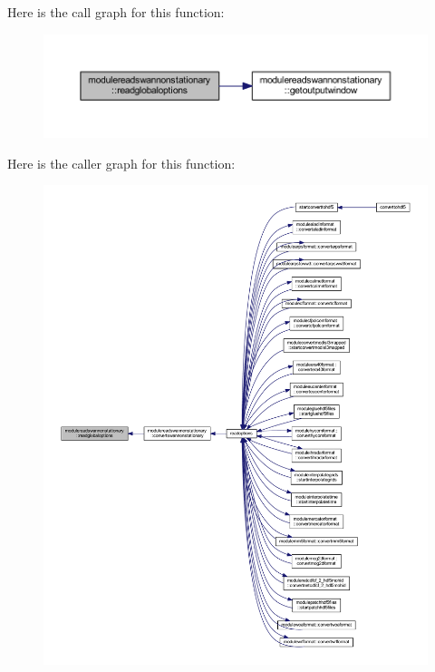 Here is the call graph for this function\+:\nopagebreak
\begin{figure}[H]
\begin{center}
\leavevmode
\includegraphics[width=350pt]{namespacemodulereadswannonstationary_a3ca3fa603083a13bf688eeba197ef307_cgraph}
\end{center}
\end{figure}
Here is the caller graph for this function\+:\nopagebreak
\begin{figure}[H]
\begin{center}
\leavevmode
\includegraphics[width=350pt]{namespacemodulereadswannonstationary_a3ca3fa603083a13bf688eeba197ef307_icgraph}
\end{center}
\end{figure}
\mbox{\label{namespacemodulereadswannonstationary_a2326a23b25b70dbf6d20a3f4395d864e}} 
